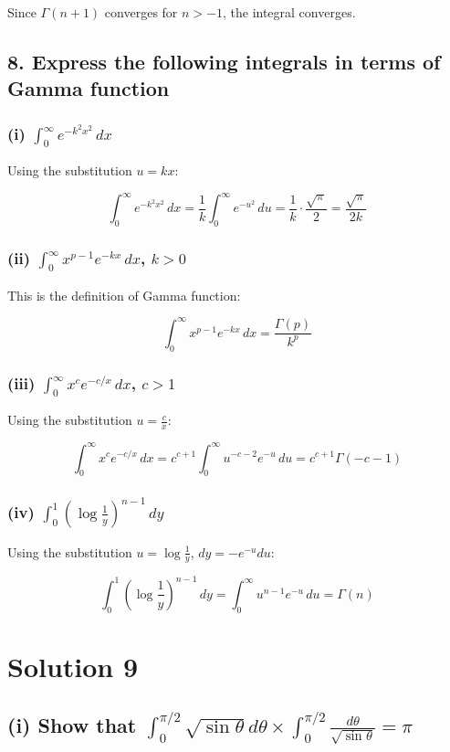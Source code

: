 \documentclass{article}
\begin{document}
Since \(\Gamma(n+1)\) converges for \( n > -1 \), the integral converges.

\subsection*{8. Express the following integrals in terms of Gamma function}
\subsubsection*{(i) \(\int_0^\infty e^{-k^2 x^2} \, dx\)}
Using the substitution \( u = kx \):


\[
\int_0^\infty e^{-k^2 x^2} \, dx = \frac{1}{k} \int_0^\infty e^{-u^2} \, du = \frac{1}{k} \cdot \frac{\sqrt{\pi}}{2} = \frac{\sqrt{\pi}}{2k}
\]



\subsubsection*{(ii) \(\int_0^\infty x^{p-1} e^{-kx} \, dx \), \( k > 0 \)}
This is the definition of Gamma function:


\[
\int_0^\infty x^{p-1} e^{-kx} \, dx = \frac{\Gamma(p)}{k^p}
\]



\subsubsection*{(iii) \(\int_0^\infty x^c e^{-c/x} \, dx \), \( c > 1 \)}
Using the substitution \( u = \frac{c}{x} \):


\[
\int_0^\infty x^c e^{-c/x} \, dx = c^{c+1} \int_0^\infty u^{-c-2} e^{-u} \, du = c^{c+1} \Gamma(-c-1)
\]



\subsubsection*{(iv) \(\int_0^1 (\log \frac{1}{y})^{n-1} \, dy\)}
Using the substitution \( u = \log \frac{1}{y} \), \( dy = -e^{-u} du \):


\[
\int_0^1 (\log \frac{1}{y})^{n-1} \, dy = \int_0^\infty u^{n-1} e^{-u} \, du = \Gamma(n)
\]

\section*{Solution 9}

\subsection*{(i) Show that $\int_0^{\pi/2} \sqrt{\sin \theta}d\theta \times \int_0^{\pi/2} \frac{d\theta}{\sqrt{\sin \theta}} = \pi$}
\end{document}
